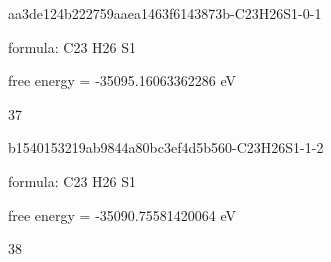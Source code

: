 \documentclass{article}
\begin{document}
\vspace{1cm}


aa3de124b222759aaea1463f6143873b-C23H26S1-0-1



formula: C23 H26 S1



free energy = -35095.16063362286 eV

37

\vspace{1cm}


b1540153219ab9844a80bc3ef4d5b560-C23H26S1-1-2



formula: C23 H26 S1



free energy = -35090.75581420064 eV

38
\end{document}
